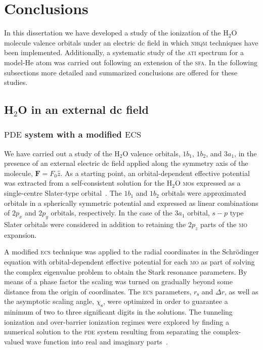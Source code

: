 \chapter{Conclusions}
\label{ch:conclusions}

In this dissertation we have developed a study of the ionization of
the H$_{2}$O molecule valence orbitals under an electric dc field in
which \textsc{nhqm} techniques have been implemented. Additionally, a
systematic study of the \textsc{ati} spectrum for a model-He atom was
carried out following an extension of the \textsc{sfa}. In the
following subsections more detailed and summarized conclusions are
offered for these studies.

\section{H$_{2}$O in an external dc field}
\label{ch:h2o_results}

\subsection*{$\mathrm{PDE}$ system with a modified $\mathrm{ECS}$}



We have carried out a study of the H$_{2}$O valence orbitals,
$1b_{1}$, $1b_{2}$, and $3a_{1}$, in the presence of an external
electric dc field applied along the symmetry axis of the molecule,
$\mathbf{F} = F_{0}\hat{z}$. As a starting point, an orbital-dependent
effective potential was extracted from a self-consistent solution for
the H$_{2}$O \textsc{mo}s expressed as a single-centre Slater-type
orbital~\cite{Moccia_1964}. The $1b_{1}$ and $1b_{2}$ orbitals were
approximated orbitals in a spherically symmetric potential and
expressed as linear combinations of $2p_{x}$ and $2p_{y}$ orbitals,
respectively. In the case of the $3a_{1}$ orbital, $s-p$ type Slater
orbitals were considered in addition to retaining the $2p_{z}$ parts
of the \textsc{mo} expansion.

A modified \textsc{ecs} technique was applied to the radial
coordinates in the Schr\"{o}dinger equation with orbital-dependent
effective potential for each \textsc{mo} as part of solving the
complex eigenvalue problem to obtain the Stark resonance
parameters. By means of a phase factor the scaling was turned on
gradually beyond some distance from the origin of coordinates. The
\textsc{ecs} parameters, $r_{\mathrm{s}}$ and $\Delta r$, as well as
the asymptotic scaling angle, $\chi_{\mathrm{s}}$, were optimized in
order to guarantee a minimum of two to three significant digits in the
solutions. The tunneling ionization and over-barrier ionization
regimes were explored by finding a numerical solution to the
\textsc{pde} system resulting from separating the complex-valued wave
function into real and imaginary parts~\cite{sarias_2016,sarias_2017}.


